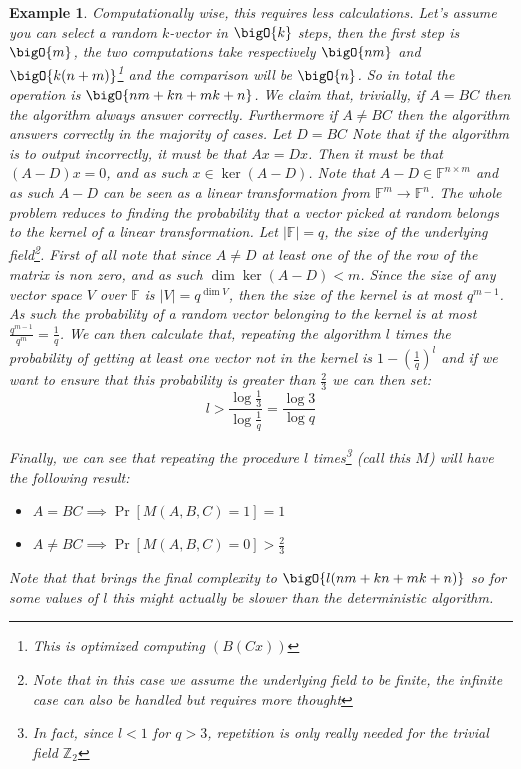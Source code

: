 \documentclass{article}
\newtheorem{example}{Example}
\begin{document}
\begin{example}
Computationally wise, this requires less calculations. Let's assume you can select a random $k$-vector in $\bigO{k}$ steps, then the first step is $\bigO{m}$, the two computations take respectively $\bigO{nm}$ and $\bigO{k (n + m)}$\footnote{This is optimized computing $(B(Cx))$} and the comparison will be $\bigO{n}$. So in total the operation is $\bigO{nm + kn + mk + n}$. We claim that, trivially, if $A = BC$ then the algorithm always answer correctly. Furthermore if $A \neq BC$ then the algorithm answers correctly in the majority of cases. Let $D = BC$ Note that if the algorithm is to output incorrectly, it must be that $Ax = Dx$. Then it must be that $(A - D) x = 0$, and as such $x \in \ker(A - D)$. Note that $A - D \in \mathbb{F}^{n \times m}$ and as such $A - D$ can be seen as a linear transformation from $\mathbb{F}^m \to \mathbb{F}^n$. The whole problem reduces to finding the probability that a vector picked at random belongs to the kernel of a linear transformation. Let $|\mathbb{F}| = q$, the size of the underlying field\footnote{Note that in this case we assume the underlying field to be finite, the infinite case can also be handled but requires more thought}. First of all note that since $A \neq D$ at least one of the of the row of the matrix is non zero, and as such $\dim \ker (A - D) < m$. Since the size of any vector space $V$ over $\mathbb{F}$ is $|V| = q^{\dim V}$, then the size of the kernel is at most $q^{m - 1}$. As such the probability of a random vector belonging to the kernel is at most $\frac{q^{m-1}}{q^m}=\frac{1}{q}$. We can then calculate that, repeating the algorithm $l$ times the probability of getting at least one vector not in the kernel is $1 - \left(\frac{1}{q}\right)^l$ and if we want to ensure that this probability is greater than $\frac{2}{3}$ we can then set:
\[l > \frac{\log \frac{1}{3}}{\log \frac{1}{q}} = \frac{\log{3}}{\log{q}}\]

Finally, we can see that repeating the procedure $l$ times\footnote{In fact, since $l < 1$ for $q > 3$, repetition is only really needed for the trivial field $\mathbb{Z}_2$} (call this $M$) will have the following result:
\begin{itemize}
    \item $A = BC \implies \Pr[M(A, B,C) = 1] = 1$
    \item $A \neq BC \implies \Pr[M(A, B,C) = 0] > \frac{2}{3}$
\end{itemize}

Note that that brings the final complexity to $\bigO{l(nm + kn + mk + n)}$ so for some values of $l$ this might actually be slower than the deterministic algorithm.

\end{example}
\end{document}
